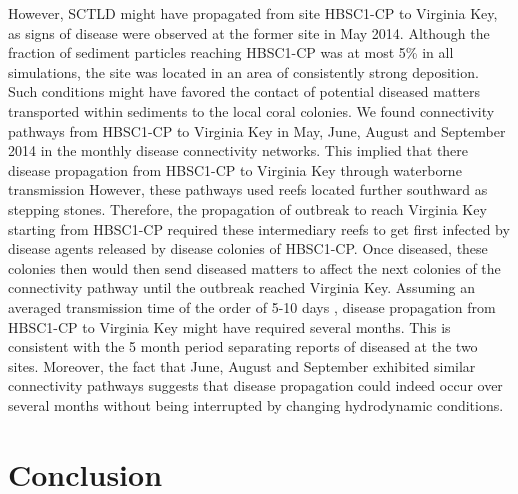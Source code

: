 \documentclass[preprint,12pt,authoryear]{elsarticle}
\begin{document}
However, SCTLD might have propagated from site HBSC1-CP to Virginia Key, as signs of disease were observed at the former site in May 2014. Although the fraction of sediment particles reaching HBSC1-CP was at most 5\% in all simulations, the site was located in an area of consistently strong deposition. Such conditions might have favored the contact of potential diseased matters transported within sediments to the local coral colonies. We found connectivity pathways from HBSC1-CP to Virginia Key in May, June, August and September 2014 in the monthly disease connectivity networks. This implied that there disease propagation from HBSC1-CP to Virginia Key through waterborne transmission \citep{aeby2019pathogenesis,dobbelaere2020coupled,eaton2021measuring, meiling2021variable} However, these pathways used reefs located further southward as stepping stones. Therefore, the propagation of outbreak to reach Virginia Key starting from HBSC1-CP required these intermediary reefs to get first infected by disease agents released by disease colonies of HBSC1-CP. Once diseased, these colonies then would then send diseased matters to affect the next colonies of the connectivity pathway until the outbreak reached Virginia Key. Assuming an averaged transmission time of the order of 5-10 days \citep{dobbelaere2020coupled}, disease propagation from HBSC1-CP to Virginia Key might have required several months. This is consistent with the 5 month period separating reports of diseased at the two sites. Moreover, the fact that June, August and September exhibited similar connectivity pathways suggests that disease propagation could indeed occur over several months without being interrupted by changing hydrodynamic conditions.


\section{Conclusion}


 

\end{document}
